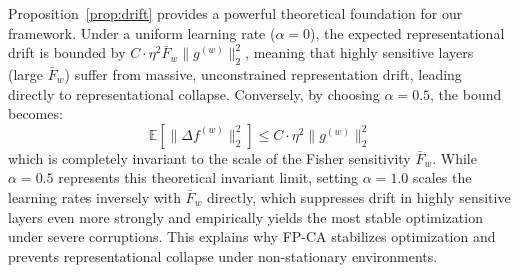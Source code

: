 \documentclass{article}
\theoremstyle{plain}
\theoremstyle{definition}
\theoremstyle{remark}
\begin{document}
Proposition~\ref{prop:drift} provides a powerful theoretical foundation for our framework. Under a uniform learning rate ($\alpha = 0$), the expected representational drift is bounded by $C \cdot \eta^2 \bar{F}_w \|g^{(w)}\|^2_2$, meaning that highly sensitive layers (large $\bar{F}_w$) suffer from massive, unconstrained representation drift, leading directly to representational collapse. Conversely, by choosing $\alpha = 0.5$, the bound becomes:
\begin{equation}
  \mathbb{E}[\|\Delta f^{(w)}\|^2_2] \leq C \cdot \eta^2 \|g^{(w)}\|^2_2
\end{equation}
which is completely invariant to the scale of the Fisher sensitivity $\bar{F}_w$. While $\alpha = 0.5$ represents this theoretical invariant limit, setting $\alpha = 1.0$ scales the learning rates inversely with $\bar{F}_w$ directly, which suppresses drift in highly sensitive layers even more strongly and empirically yields the most stable optimization under severe corruptions. This explains why FP-CA stabilizes optimization and prevents representational collapse under non-stationary environments.
\end{document}
